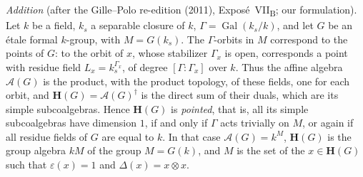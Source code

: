 \par\medskip\noindent{}%
\emph{Addition} (after the Gille--Polo re-edition (2011),
Expos\'e~VII\textsubscript{B}; our formulation). Let \(k\) be a field,
\(k_s\) a separable closure of \(k\), \(\Gamma=\operatorname{Gal}(k_s/k)\),
and let \(G\) be an étale formal \(k\)-group, with \(M=G(k_s)\). The
\(\Gamma\)-orbits in \(M\) correspond to the points of \(G\): to the
orbit of \(x\), whose stabilizer \(\Gamma_x\) is open, corresponds a point
with residue field \(L_x=k_s^{\Gamma_x}\), of degree \([\Gamma:\Gamma_x]\)
over \(k\). Thus the affine algebra \(\mathcal A(G)\) is the product, with
the product topology, of these fields, one for each orbit, and
\(\mathbf H(G)=\mathcal A(G)^\dagger\) is the direct sum of their duals,
which are its simple subcoalgebras. Hence \(\mathbf H(G)\) is
\emph{pointed}, that is, all its simple subcoalgebras have dimension
\(1\), if and only if \(\Gamma\) acts trivially on \(M\), or again if all
residue fields of \(G\) are equal to \(k\). In that case
\(\mathcal A(G)=k^M\), \(\mathbf H(G)\) is the group algebra \(kM\) of
the group \(M=G(k)\), and \(M\) is the set of the \(x\in\mathbf H(G)\)
such that \(\varepsilon(x)=1\) and \(\Delta(x)=x\otimes x\).
